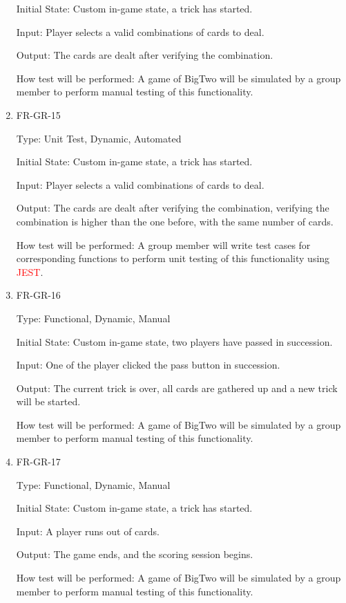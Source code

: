 \documentclass[12pt, titlepage]{article}
\begin{document}
\begin{enumerate}
Initial State: Custom in-game state, a trick has started.
					
Input: Player selects a valid combinations of cards to deal.
					
Output: The cards are dealt after verifying the combination.
					
How test will be performed: A game of BigTwo will be simulated by a group member to perform manual testing of this functionality.

\item{FR-GR-15\\}

Type: Unit Test, Dynamic, Automated
					
Initial State: Custom in-game state, a trick has started.
					
Input: Player selects a valid combinations of cards to deal.
					
Output: The cards are dealt after verifying the combination, verifying the combination is higher than the one before, with the same number of cards.
					
How test will be performed: A group member will write test cases for corresponding functions to perform unit testing of this functionality using \textcolor{red}{JEST}.


\item{FR-GR-16\\}

Type: Functional, Dynamic, Manual
					
Initial State: Custom in-game state, two players have passed in succession.
					
Input: One of the player clicked the pass button in succession.
					
Output: The current trick is over, all cards are gathered up and a new trick will be started.
					
How test will be performed: A game of BigTwo will be simulated by a group member to perform manual testing of this functionality.

\item{FR-GR-17\\}

Type: Functional, Dynamic, Manual
					
Initial State: Custom in-game state, a trick has started.
					
Input: A player runs out of cards.
					
Output: The game ends, and the scoring session begins.
					
How test will be performed: A game of BigTwo will be simulated by a group member to perform manual testing of this functionality.

\end{enumerate}
\end{document}
